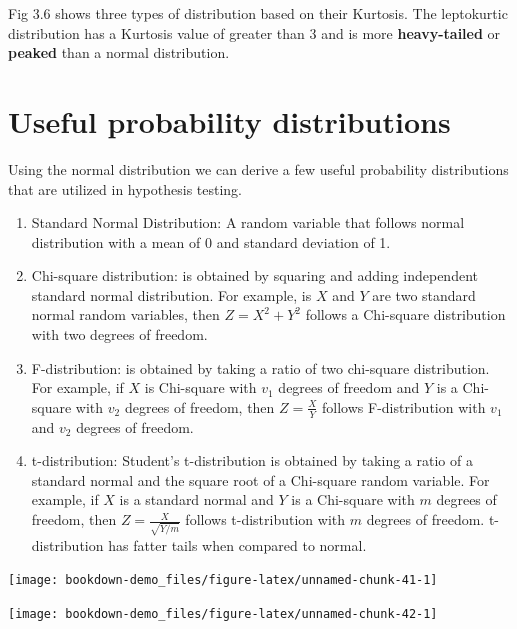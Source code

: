 \documentclass[
]{book}
\theoremstyle{definition}
\theoremstyle{definition}
\theoremstyle{definition}
\theoremstyle{definition}
\theoremstyle{remark}
\begin{document}
Fig 3.6 shows three types of distribution based on their Kurtosis. The leptokurtic distribution has a Kurtosis value of greater than 3 and is more \textbf{heavy-tailed} or \textbf{peaked} than a normal distribution.

\hypertarget{useful-probability-distributions}{%
\section{Useful probability distributions}\label{useful-probability-distributions}}

Using the normal distribution we can derive a few useful probability distributions that are utilized in hypothesis testing.

\begin{enumerate}
\def\labelenumi{\arabic{enumi}.}
\item
  Standard Normal Distribution: A random variable that follows normal distribution with a mean of 0 and standard deviation of 1.
\item
  Chi-square distribution: is obtained by squaring and adding independent standard normal distribution. For example, is \(X\) and \(Y\) are two standard normal random variables, then \(Z=X^2 + Y^2\) follows a Chi-square distribution with two degrees of freedom.
\item
  F-distribution: is obtained by taking a ratio of two chi-square distribution. For example, if \(X\) is Chi-square with \(v_1\) degrees of freedom and \(Y\) is a Chi-square with \(v_2\) degrees of freedom, then \(\displaystyle{Z=\frac{X}{Y}}\) follows F-distribution with \(v_1\) and \(v_2\) degrees of freedom.
\item
  t-distribution: Student's t-distribution is obtained by taking a ratio of a standard normal and the square root of a Chi-square random variable. For example, if \(X\) is a standard normal and \(Y\) is a Chi-square with \(m\) degrees of freedom, then \(Z=\displaystyle\frac{X}{\sqrt{Y/m}}\) follows t-distribution with \(m\) degrees of freedom. t-distribution has fatter tails when compared to normal.
\end{enumerate}

\begin{center}\texttt{[image: bookdown-demo\_files/figure-latex/unnamed-chunk-41-1]} \end{center}

\begin{center}\texttt{[image: bookdown-demo\_files/figure-latex/unnamed-chunk-42-1]} \end{center}
\end{document}

